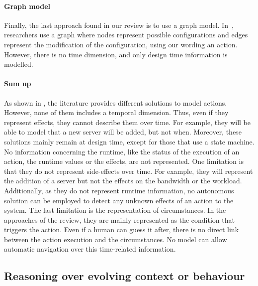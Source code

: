 \paragraph{Graph model}
Finally, the last approach found in our review is to use a graph model.
In~\cite{DBLP:journals/computer/GeorgasHT09}, researchers use a graph where nodes represent possible configurations and edges represent the modification of the configuration, using our wording an \gls{action}.
However, there is no time dimension, and only design time information is modelled.

\paragraph{Sum up}
As shown in , the literature provides different solutions to model \glspl{action}.
However, none of them includes a temporal dimension.
Thus, even if they represent effects, they cannot describe them over time.
For example, they will be able to model that a new server will be added, but not when.
Moreover, these solutions mainly remain at design time, except for those that use a state machine.
No information concerning the runtime, like the status of the execution of an action, the runtime values or the effects, are not represented.
One limitation is that they do not represent side-effects over time.
For example, they will represent the addition of a server but not the effects on the bandwidth or the workload.
Additionally, as they do not represent runtime information, no autonomous solution can be employed to detect any unknown effects of an action to the system.
The last limitation is the representation of \glspl{circumstance}.
In the approaches of the review, they are mainly represented as the condition that triggers the action.
Even if a human can guess it after, there is no direct link between the action execution and the circumstances.
No model can allow automatic navigation over this time-related information. 

\vfill
	 
\subsection[Reasoning over evolving context or behaviour]{Reasoning over evolving context or \gls{behaviour}}

